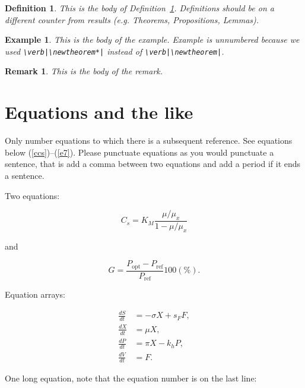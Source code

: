 \documentclass[qe,nameyear,draft]{econsocart}
\theoremstyle{plain}
\newtheorem{definition}{Definition}[section]
\newtheorem{example}{Example}[section]
\newtheorem{remark}{Remark}[section]
\begin{document}
\begin{definition}\label{de1}This is the body of Definition~\ref{de1}. Definitions should be on a different counter from results (e.g. Theorems, Propositions, Lemmas).

\end{definition}\begin{example}This is the body of the example. Example is unnumbered because we used \texttt{{\textbackslash}verb|{\textbackslash}newtheorem*|}
instead of \texttt{{\textbackslash}verb|{\textbackslash}newtheorem|}.

\end{example}\begin{remark}This is the body of the remark.

\end{remark}\section{Equations and the like}

Only number equations to which there is a subsequent reference.
See equations below (\ref{ccs})--(\ref{e7}). Please punctuate equations as you would punctuate a sentence, that is add a comma between two equations and add a period if it ends a sentence.

Two equations:

\begin{equation}
\label{ccs}
C_{s}  =  K_{M} \frac{\mu/\mu_{x}}{1-\mu/\mu_{x}}
\end{equation}

and

\begin{equation}
G = \frac{P_{\mathrm{opt}} - P_{\mathrm{ref}}}{P_{\mathrm{ref}}}  100(\%).
\end{equation}

Equation arrays:

\begin{align}
  \frac{dS}{dt} & = - \sigma X + s_{F} F,\\
  \frac{dX}{dt} & =   \mu    X,\\
  \frac{dP}{dt} & =   \pi    X - k_{h} P,\\
  \frac{dV}{dt} & =   F.
\end{align}

One long equation, note that the equation number is on the last line:
\end{document}
